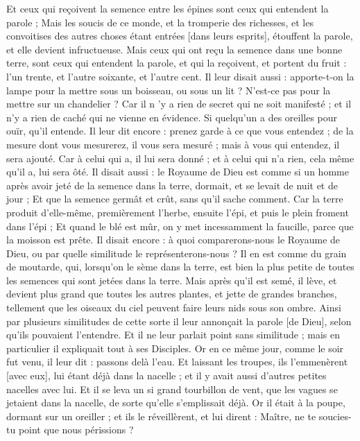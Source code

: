 \begin{multicols}{2}
Et ceux qui reçoivent la semence entre les épines sont ceux qui entendent la parole ;
Mais les soucis de ce monde, et la tromperie des richesses, et les convoitises des autres choses étant entrées [dans leurs esprits], étouffent la parole, et elle devient infructueuse.
Mais ceux qui ont reçu la semence dans une bonne terre, sont ceux qui entendent la parole, et qui la reçoivent, et portent du fruit : l'un trente, et l'autre soixante, et l'autre cent.
Il leur disait aussi : apporte-t-on la lampe pour la mettre sous un boisseau, ou sous un lit ? N'est-ce pas pour la mettre sur un chandelier ?
Car il n 'y a rien de secret qui ne soit manifesté ; et il n'y a rien de caché qui ne vienne en évidence.
Si quelqu'un a des oreilles pour ouïr, qu'il entende.
Il leur dit encore : prenez garde à ce que vous entendez ; de la mesure dont vous mesurerez, il vous sera mesuré ; mais à vous qui entendez, il sera ajouté.
Car à celui qui a, il lui sera donné ; et à celui qui n'a rien, cela même qu'il a, lui sera ôté.
Il disait aussi : le Royaume de Dieu est comme si un homme après avoir jeté de la semence dans la terre, dormait, et se levait de nuit et de jour ;
Et que la semence germât et crût, sans qu'il sache comment.
Car la terre produit d'elle-même, premièrement l'herbe, ensuite l'épi, et puis le plein froment dans l'épi ;
Et quand le blé est mûr, on y met incessamment la faucille, parce que la moisson est prête.
Il disait encore : à quoi comparerons-nous le Royaume de Dieu, ou par quelle similitude le représenterons-nous ?
Il en est comme du grain de moutarde, qui, lorsqu'on le sème dans la terre, est bien la plus petite de toutes les semences qui sont jetées dans la terre.
Mais après qu'il est semé, il lève, et devient plus grand que toutes les autres plantes, et jette de grandes branches, tellement que les oiseaux du ciel peuvent faire leurs nids sous son ombre.
Ainsi par plusieurs similitudes de cette sorte il leur annonçait la parole [de Dieu], selon qu'ils pouvaient l'entendre.
Et il ne leur parlait point sans similitude ; mais en particulier il expliquait tout à ses Disciples.
Or en ce même jour, comme le soir fut venu, il leur dit : passons delà l'eau.
Et laissant les troupes, ils l'emmenèrent [avec eux], lui étant déjà dans la nacelle ; et il y avait aussi d'autres petites nacelles avec lui.
Et il se leva un si grand tourbillon de vent, que les vagues se jetaient dans la nacelle, de sorte qu'elle s’emplissait déjà.
Or il était à la poupe, dormant sur un oreiller ; et ils le réveillèrent, et lui dirent : Maître, ne te soucies-tu point que nous périssions ?

\end{multicols}
